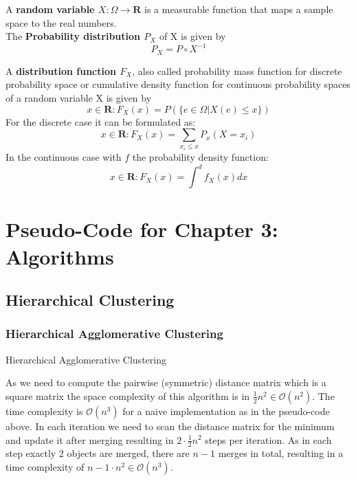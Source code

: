 A \textbf{random variable $X: \Omega \rightarrow \mathbf{R}$} is a measurable function that maps a sample space to the real numbers. \\
The \textbf{Probability distribution $P_X$} of X is given by \[ P_X = P \circ X^{-1} \]

A \textbf{distribution function $F_X$}, also called probability mass function for discrete probability space or cumulative density function for continuous probability spaces of a random variable X is given by \[ x \in \mathbf{R}: F_X(x) = P(\{e \in \Omega | X(e) \leq x\}) \]
For the discrete case it can be formulated as: \[ x \in \mathbf{R}: F_X(x) = \sum_{x_i \leq x} P_x (X = x_i) \]
In the continuous case with $f$ the probability density function: \[ x \in \mathbf{R}: F_X(x) = \int^d f_X(x) dx \]



\section{Pseudo-Code for Chapter 3: Algorithms}\label{\positionnumber}
\subsection{Hierarchical Clustering}\label{\positionnumber}
\subsubsection{Hierarchical Agglomerative Clustering}\label{\positionnumber}
\begin{algorithm}[htp]
    \hrulealg
\caption{Hierarchical Agglomerative Clustering}\label{agglo}
\end{algorithm}
As we need to compute the pairwise (symmetric) distance matrix which is a square matrix the space complexity of this algorithm is in $\frac{1}{2} n^2 \in \mathcal{O}(n^2)$. The time complexity is $\mathcal{O}(n^3)$ for a naive implementation as in the pseudo-code above. In each iteration we need to scan the distance matrix for the minimum and update it after merging resulting in  $2 \cdot \frac{1}{2} n^2$ steps per iteration. As in each step exactly 2 objects are merged, there are $n-1$ merges in total, resulting in a time complexity of $n - 1 \cdot n^2 \in \mathcal{O}(n^3)$.


